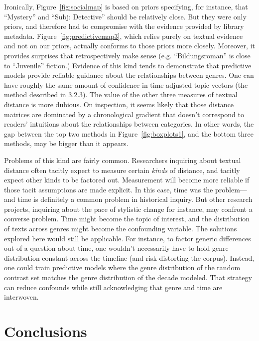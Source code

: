 \documentclass[11pt]{article}
\begin{document}
Ironically, Figure~\ref{fig:socialmap} is based on priors specifying, for instance, that ``Mystery'' and ``Subj: Detective'' should be relatively close. But they were only priors, and therefore had to compromise with the evidence provided by library metadata. Figure~\ref{fig:predictivemap3}, which relies purely on textual evidence and not on our priors, actually conforms to those priors more closely. Moreover, it provides surprises that retrospectively make sense (e.g. ``Bildungsroman'' is close to ``Juvenile'' fiction.) Evidence of this kind tends to demonstrate that predictive models provide reliable guidance about the relationships between genres. One can have roughly the same amount of confidence in time-adjusted topic vectors (the method described in 3.2.3). The value of the other three measures of textual distance is more dubious. On inspection, it seems likely that those distance matrices are dominated by a chronological gradient that doesn't correspond to readers' intuitions about the relationships between categories. In other words, the gap between the top two methods in Figure~\ref{fig:boxplots1}, and the bottom three methods, may be bigger than it appears.

Problems of this kind are fairly common. Researchers inquiring about textual distance often tacitly expect to measure certain \textit{kinds} of distance, and tacitly expect other kinds to be factored out. Measurement will become more reliable if those tacit assumptions are made explicit. In this case, time was the problem---and time is definitely a common problem in historical inquiry. But other research projects, inquiring about the pace of stylistic change for instance, may confront a converse problem. Time might become the topic of interest, and the distribution of texts across genres might become the confounding variable. The solutions explored here would still be applicable. For instance, to factor generic differences out of a question about time, one wouldn't necessarily have to hold genre distribution constant across the timeline (and risk distorting the corpus). Instead, one could train predictive models where the genre distribution of the random contrast set matches the genre distribution of the decade modeled. That strategy can reduce confounds while still acknowledging that genre and time are interwoven.

\section{Conclusions}
\end{document}
